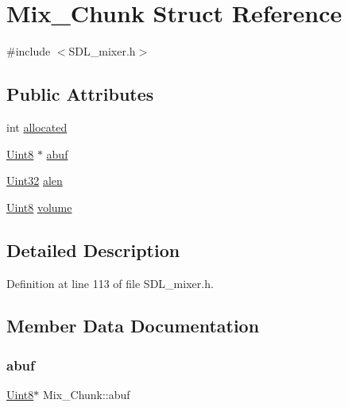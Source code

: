 \hypertarget{struct_mix___chunk}{}\section{Mix\+\_\+\+Chunk Struct Reference}
\label{struct_mix___chunk}


{\ttfamily \#include $<$S\+D\+L\+\_\+mixer.\+h$>$}

\subsection*{Public Attributes}
\begin{DoxyCompactItemize}
\item 
int \mbox{\hyperlink{struct_mix___chunk_a7b985b90b5f97fffe34834116a281615}{allocated}}
\item 
\mbox{\hyperlink{_s_d_l__stdinc_8h_a2944638813a090aa23e62f4da842c3e2}{Uint8}} $\ast$ \mbox{\hyperlink{struct_mix___chunk_a30b3b1a72677d076a1caa72422bb3774}{abuf}}
\item 
\mbox{\hyperlink{_s_d_l__stdinc_8h_add440eff171ea5f55cb00c4a9ab8672d}{Uint32}} \mbox{\hyperlink{struct_mix___chunk_a958507964471fc4b9fa0d215f1852d05}{alen}}
\item 
\mbox{\hyperlink{_s_d_l__stdinc_8h_a2944638813a090aa23e62f4da842c3e2}{Uint8}} \mbox{\hyperlink{struct_mix___chunk_afc566fd5da7f0ed1f3577f5bc0eac319}{volume}}
\end{DoxyCompactItemize}


\subsection{Detailed Description}


Definition at line 113 of file S\+D\+L\+\_\+mixer.\+h.



\subsection{Member Data Documentation}
\mbox{\label{struct_mix___chunk_a30b3b1a72677d076a1caa72422bb3774}} 
\subsubsection{\texorpdfstring{abuf}{abuf}}
{\footnotesize\ttfamily \mbox{\hyperlink{_s_d_l__stdinc_8h_a2944638813a090aa23e62f4da842c3e2}{Uint8}}$\ast$ Mix\+\_\+\+Chunk\+::abuf}



